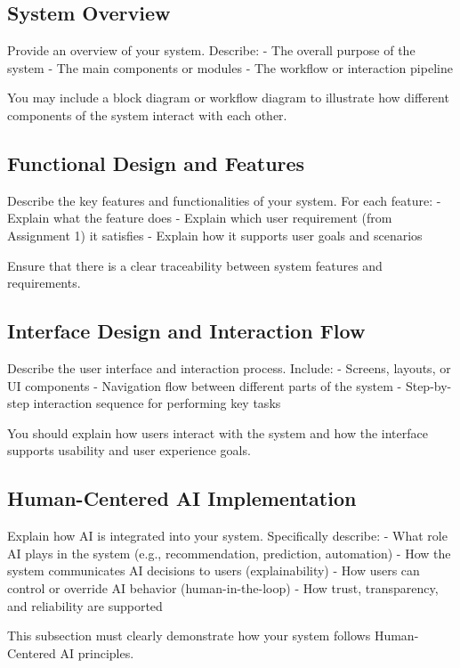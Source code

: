 \documentclass[sigconf]{acmart}
\begin{document}
\subsection{System Overview}

Provide an overview of your system. Describe:
- The overall purpose of the system
- The main components or modules
- The workflow or interaction pipeline

You may include a block diagram or workflow diagram to illustrate how different components of the system interact with each other.

\subsection{Functional Design and Features}

Describe the key features and functionalities of your system. For each feature:
- Explain what the feature does
- Explain which user requirement (from Assignment 1) it satisfies
- Explain how it supports user goals and scenarios

Ensure that there is a clear traceability between system features and requirements.

\subsection{Interface Design and Interaction Flow}

Describe the user interface and interaction process. Include:
- Screens, layouts, or UI components
- Navigation flow between different parts of the system
- Step-by-step interaction sequence for performing key tasks

You should explain how users interact with the system and how the interface supports usability and user experience goals.

\subsection{Human-Centered AI Implementation}

Explain how AI is integrated into your system. Specifically describe:
- What role AI plays in the system (e.g., recommendation, prediction, automation)
- How the system communicates AI decisions to users (explainability)
- How users can control or override AI behavior (human-in-the-loop)
- How trust, transparency, and reliability are supported

This subsection must clearly demonstrate how your system follows Human-Centered AI principles.
\end{document}
